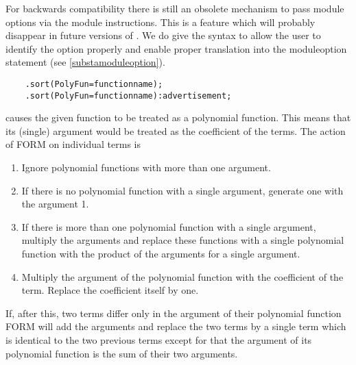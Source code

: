 For backwards compatibility there is still an obsolete 
mechanism to pass module options via the module instructions. This is a 
feature which will probably disappear in future versions of \FORM. We do 
give the syntax to allow the user to identify the option properly and 
enable proper translation into the moduleoption 
statement (see \ref{substamoduleoption}).
\begin{verbatim}
    .sort(PolyFun=functionname);
    .sort(PolyFun=functionname):advertisement;
\end{verbatim}
causes the given function to be treated as a polynomial 
function. This means that its (single) argument would be treated as the 
coefficient of the terms. The action of FORM on individual terms is
\begin{enumerate}
\item Ignore polynomial functions with more than one argument.
\item If there is no polynomial function with a single argument, generate 
one with the argument 1.\item If there is more than one polynomial function 
with a single argument, multiply the arguments and replace these functions 
with a single polynomial function with the product of the arguments for a 
single argument.
\item Multiply the argument of the polynomial function with the coefficient 
of the term. Replace the coefficient itself by one.
\end{enumerate}
If, after this, two terms differ only in the argument of their polynomial 
function FORM will add the arguments and replace the two terms by a single 
term which is identical to the two previous terms except for that the 
argument of its polynomial function is the sum of their two arguments.

